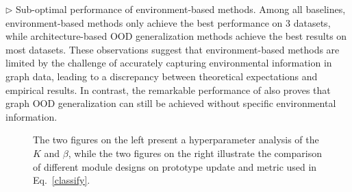 \noindent$\rhd$ \textsf{Sub-optimal performance of environment-based methods.}
Among all baselines, environment-based methods only achieve the best performance on 3 datasets, while architecture-based OOD generalization methods achieve the best results on most datasets. These observations suggest that environment-based methods are limited by the challenge of accurately capturing environmental information in graph data, leading to a discrepancy between theoretical expectations and empirical results. In contrast, the remarkable performance of \ourmethod also proves that graph OOD generalization can still be achieved without specific environmental information.
\begin{figure*}[!t]
    \centering
    \hfill
    \hfill
    \hfill
    \vspace{-4mm}
    \caption{The two figures on the left present a hyperparameter analysis of the  $K$ and $\beta$, while the two figures on the right illustrate the comparison of different module designs on prototype update and metric used in Eq.~\eqref{classify}. } 
    \vspace{-2mm}
    \label{fig:four_images}
    
\end{figure*}
